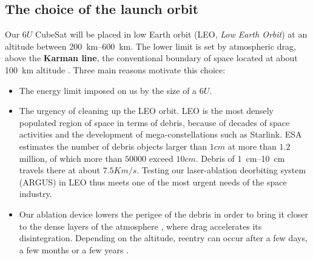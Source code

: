 \documentclass[11pt,a4paper]{article}
\begin{document}
\subsection{The choice of the launch orbit}
Our $6U$ CubeSat will be placed in low Earth orbit (LEO, \textit{Low Earth Orbit}) at an altitude between \SIrange{200}{600}{\kilo\metre}. The lower limit is set by atmospheric drag, above the \textbf{Karman line}, the conventional boundary of space located at about \SI{100}{\kilo\metre} altitude \cite{McDowell2018}. Three main reasons motivate this choice:
\begin{itemize}
    \item The energy limit imposed on us by the size of a $6U$.\\

    \item The urgency of cleaning up the LEO orbit. LEO is the most densely populated region of space in terms of debris, because of decades of space activities and the development of mega-constellations such as Starlink. ESA estimates the number of debris objects larger than $1 cm$ at more than $1.2$ million, of which more than $50000$ exceed $10cm$\cite{ESA2025}. Debris of \SIrange{1}{10}{\centi\metre} travels there at about $7.5 Km/s$\cite{Vallado2013}. Testing our laser-ablation deorbiting system (ARGUS) in LEO thus meets one of the most urgent needs of the space industry.

    \item Our ablation device lowers the perigee of the debris in order to bring it closer to the dense layers of the atmosphere \cite{Phipps2012}, where drag accelerates its disintegration. Depending on the altitude, reentry can occur after a few days, a few months or a few years \cite{Crisp2020}. 
\end{itemize}
\end{document}
